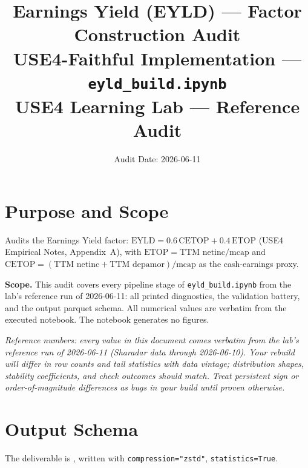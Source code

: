 \documentclass[11pt,a4paper]{article}
\title{\textbf{Earnings Yield (EYLD) --- Factor Construction Audit}\\[2pt]
\large USE4-Faithful Implementation --- \texttt{eyld\_build.ipynb}\\[4pt]
\normalsize USE4 Learning Lab --- Reference Audit}
\author{Audit Date: 2026-06-11}
\date{}
\newcommand{\NOTE}[1]{\textcolor{note}{\textit{#1}}}
\begin{document}
\maketitle
\tableofcontents
\newpage

\section{Purpose and Scope}

Audits the Earnings Yield factor:
$\mathrm{EYLD} = 0.6\,\mathrm{CETOP} + 0.4\,\mathrm{ETOP}$ (USE4 Empirical Notes,
Appendix~A), with $\mathrm{ETOP} = \text{TTM netinc}/\text{mcap}$ and
$\mathrm{CETOP} = (\text{TTM netinc} + \text{TTM depamor})/\text{mcap}$ as the
cash-earnings proxy.

\smallskip
\textbf{Scope.} This audit covers every pipeline stage of
\texttt{eyld\_build.ipynb} from the lab's reference run of 2026-06-11: all printed diagnostics, the
validation battery, and the output parquet schema. All numerical values are
verbatim from the executed notebook. The notebook generates no figures.

\NOTE{Reference numbers: every value in this document comes verbatim from the lab's reference run of 2026-06-11 (Sharadar data through 2026-06-10). Your rebuild will differ in row counts and tail statistics with data vintage; distribution shapes, stability coefficients, and check outcomes should match. Treat persistent sign or order-of-magnitude differences as bugs in your build until proven otherwise.}


\section{Output Schema}

The deliverable is , written with
\texttt{compression="zstd"}, \newline\texttt{statistics=True}.
\end{document}
